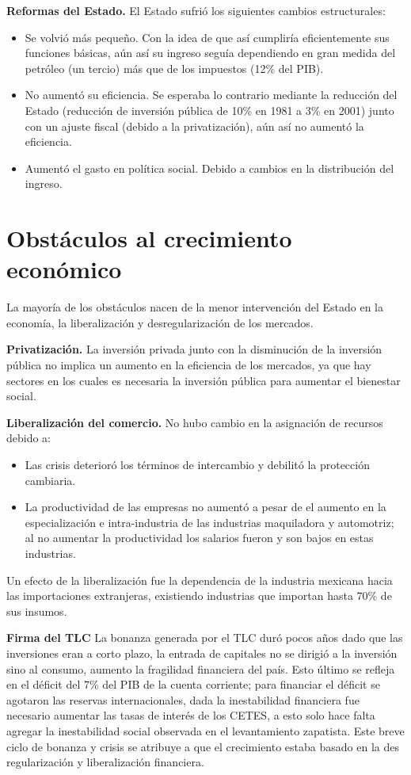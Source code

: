\textbf{Reformas del Estado.}
El Estado sufrió los siguientes cambios estructurales:
\begin{itemize}
    \item Se volvió más pequeño. Con la idea de que así cumpliría eficientemente sus funciones básicas, aún así su ingreso seguía dependiendo en gran medida del petróleo (un tercio) más que de los impuestos (12\% del PIB).
    \item No aumentó su eficiencia. Se esperaba lo contrario mediante la reducción del Estado (reducción de inversión pública de 10\% en 1981 a 3\% en 2001) junto con un ajuste fiscal (debido a la privatización), aún así no aumentó la eficiencia.
    \item Aumentó el gasto en política social. Debido a cambios en la distribución del ingreso.
\end{itemize}


\section{Obstáculos al crecimiento económico}
La mayoría de los obstáculos nacen de la menor intervención del Estado en la economía, la liberalización y desregularización de los mercados.

\textbf{Privatización.}
La inversión privada junto con la disminución de la inversión pública no implica un aumento en la eficiencia de los mercados, ya que hay sectores en los cuales es necesaria la inversión pública para aumentar el bienestar social.

\textbf{Liberalización del comercio.}
No hubo cambio en la asignación de recursos debido a:
\begin{itemize}
    \item Las crisis deterioró los términos de intercambio y debilitó la protección cambiaria.
    \item La productividad de las empresas no aumentó a pesar de el aumento en la especialización e intra-industria de las industrias maquiladora y automotriz; al no aumentar la productividad los salarios fueron y son bajos en estas industrias.
\end{itemize}
Un efecto de la liberalización fue la dependencia de la industria mexicana hacia las importaciones extranjeras, existiendo industrias que importan hasta 70\% de sus insumos.

\textbf{Firma del TLC}
La bonanza generada por el TLC duró pocos años dado que las inversiones eran a corto plazo, la entrada de capitales no se dirigió a la inversión sino al consumo, aumento la fragilidad financiera del país. Esto último se refleja en el déficit del 7\% del PIB de la cuenta corriente; para financiar el déficit se agotaron las reservas internacionales, dada la inestabilidad financiera fue necesario aumentar las tasas de interés de los CETES, a esto solo hace falta agregar la inestabilidad social observada en el levantamiento zapatista.
Este breve ciclo de bonanza y crisis se atribuye a que el crecimiento estaba basado en la des regularización y liberalización financiera.

